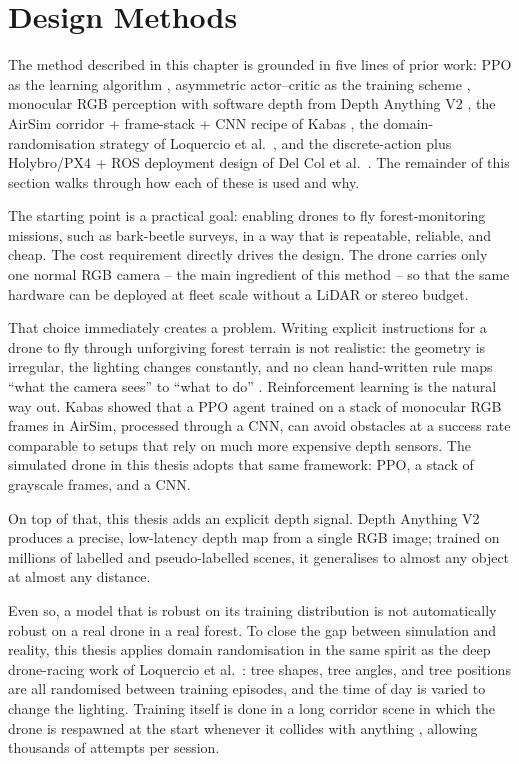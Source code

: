 \documentclass[../main.tex]{subfiles}
\begin{document}
\section{Design Methods}
\justify

The method described in this chapter is grounded in five lines of prior work: PPO as the learning algorithm \cite{Schulman2017}, asymmetric actor--critic as the training scheme \cite{Pinto2017}, monocular RGB perception with software depth from Depth Anything V2 \cite{Yang2024DepthAnythingV2}, the AirSim corridor + frame-stack + CNN recipe of Kabas \cite{Kabas2022}, the domain-randomisation strategy of Loquercio et al.\ \cite{Loquercio2019}, and the discrete-action plus Holybro/PX4 + ROS deployment design of Del Col et al.\ \cite{DelCol2025}. The remainder of this section walks through how each of these is used and why.

The starting point is a practical goal: enabling drones to fly forest-monitoring missions, such as bark-beetle surveys, in a way that is repeatable, reliable, and cheap. The cost requirement directly drives the design. The drone carries only one normal RGB camera -- the main ingredient of this method -- so that the same hardware can be deployed at fleet scale without a LiDAR or stereo budget.

That choice immediately creates a problem. Writing explicit instructions for a drone to fly through unforgiving forest terrain is not realistic: the geometry is irregular, the lighting changes constantly, and no clean hand-written rule maps ``what the camera sees'' to ``what to do'' \cite{Kabas2022}. Reinforcement learning is the natural way out. Kabas \cite{Kabas2022} showed that a PPO agent trained on a stack of monocular RGB frames in AirSim, processed through a CNN, can avoid obstacles at a success rate comparable to setups that rely on much more expensive depth sensors. The simulated drone in this thesis adopts that same framework: PPO, a stack of grayscale frames, and a CNN.

On top of that, this thesis adds an explicit depth signal. Depth Anything V2 \cite{Yang2024DepthAnythingV2} produces a precise, low-latency depth map from a single RGB image; trained on millions of labelled and pseudo-labelled scenes, it generalises to almost any object at almost any distance.

Even so, a model that is robust on its training distribution is not automatically robust on a real drone in a real forest. To close the gap between simulation and reality, this thesis applies domain randomisation in the same spirit as the deep drone-racing work of Loquercio et al.\ \cite{Loquercio2019}: tree shapes, tree angles, and tree positions are all randomised between training episodes, and the time of day is varied to change the lighting. Training itself is done in a long corridor scene in which the drone is respawned at the start whenever it collides with anything \cite{Kabas2022,Loquercio2019}, allowing thousands of attempts per session.
\end{document}
